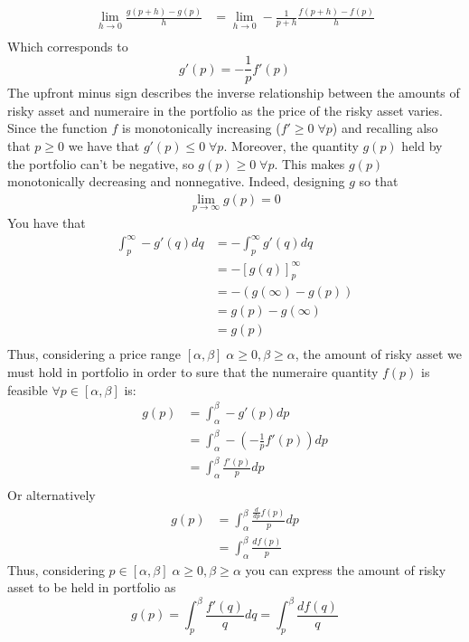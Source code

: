 \documentclass[12pt]{article}
\begin{document}
\begin{align*}
    \lim_{h\rightarrow 0}\frac{g(p+h) - g(p)}{h} & = \lim_{h\rightarrow 0}-\frac{1}{p+h}\frac{f(p+h)-f(p)}{h} \\
\end{align*}
Which corresponds to
\begin{equation}
    g'(p)= -\frac{1}{p}f'(p) \label{eq:2}
\end{equation}
The upfront minus sign describes the inverse relationship between the amounts of risky asset and numeraire in the portfolio as the price of the risky asset varies.
\newline
Since the function $f$ is monotonically increasing ($f'\geq 0 \; \forall p$) and recalling also that $p\geq 0$ we have that $g'(p)\leq 0 \; \forall p$.
Moreover, the quantity $g(p)$ held by the portfolio can't be negative, so $g(p)\geq 0 \; \forall p$. This makes $g(p)$ monotonically decreasing and nonnegative.
Indeed, designing $g$ so that
\begin{align*}
    \lim_{p\rightarrow \infty}g(p) = 0
\end{align*}
You have that
\begin{align*}
    \int_{p}^{\infty}-g'(q)dq & = -\int_{p}^{\infty}g'(q)dq \\
                              & =-[g(q)]_{p}^{\infty}       \\
                              & = -(g(\infty)-g(p))         \\
                              & = g(p)-g(\infty)            \\
                              & = g(p)                      \\
\end{align*}
Thus, considering a price range $[\alpha,\beta]\; \alpha\geq 0, \beta\geq\alpha$, the amount of risky asset we must hold in portfolio in order to sure that the numeraire quantity $f(p)$ is feasible $\forall p\in [\alpha,\beta]$ is:
\begin{align*}
    g(p) & = \int_{\alpha}^{\beta}-g'(p)dp               \\
         & = \int_{\alpha}^{\beta}-(-\frac{1}{p}f'(p))dp \\
         & = \int_{\alpha}^{\beta}\frac{f'(p)}{p}dp      \\
\end{align*}
Or alternatively
\begin{align*}
    g(p) & = \int_{\alpha}^{\beta}\frac{\frac{d}{dp}f(p)}{p}dp \\
         & =\int_{\alpha}^{\beta}\frac{df(p)}{p}
\end{align*}
Thus, considering $p\in[\alpha,\beta] \; \alpha\geq 0, \beta \geq \alpha$ you can express the amount of risky asset to be held in portfolio as
\begin{equation}
    g(p) =\int_{p}^{\beta}\frac{f'(q)}{q}dq= \int_{p}^{\beta}\frac{df(q)}{q}
\end{equation}
\end{document}
